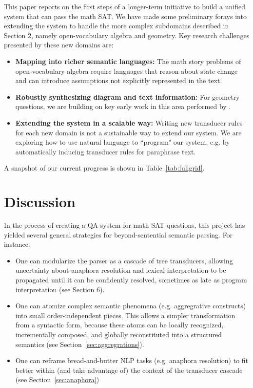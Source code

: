 \documentclass[11pt,letterpaper]{article}
\begin{document}
This paper reports on the first steps of a longer-term initiative to build a unified system that can pass the math SAT. We have made some preliminary forays into extending the system to handle the more complex subdomains described in Section 2, namely open-vocabulary algebra and geometry. Key research challenges presented by these new domains are:

\begin{itemize}
\item \textbf{Mapping into richer semantic languages: } The math story problems of open-vocabulary algebra require languages that reason about state change and can introduce assumptions not explicitly represented in the text. 
\item \textbf{Robustly synthesizing diagram and text information: } For geometry questions, we are building on key early work in this area performed by \cite{Seo2014DiagramUI,Seo2015SolvingGP}.
\item \textbf{Extending the system in a scalable way: } Writing new transducer rules for each new domain is not a sustainable way to extend our system. We are exploring how to use natural language to ``program" our system, e.g. by automatically inducing transducer rules for paraphrase text.
\end{itemize}
 
\noindent A snapshot of our current progress is shown in Table~\ref{tab:fullgrid}.


\section{Discussion}

In the process of creating a QA system for math SAT questions, this project has yielded several general strategies for beyond-sentential semantic parsing. For instance:
\begin{itemize}
	\item One can modularize the parser as a cascade of tree transducers, allowing uncertainty about anaphora resolution and lexical interpretation to be propagated until it can be confidently resolved, sometimes as late as program interpretation (see Section 6). 
	\item One can atomize complex semantic phenomena (e.g. aggregrative constructs) into small order-independent pieces. This allows a simpler transformation from a syntactic form, because these atoms can be locally recognized, incrementally composed, and globally reconstituted into a structured semantics (see Section~\ref{sec:aggregrations}).
	\item One can reframe bread-and-butter NLP tasks (e.g. anaphora resolution) to fit better within (and take advantage of) the context of the transducer cascade (see Section~\ref{sec:anaphora})
\end{itemize}
\end{document}
